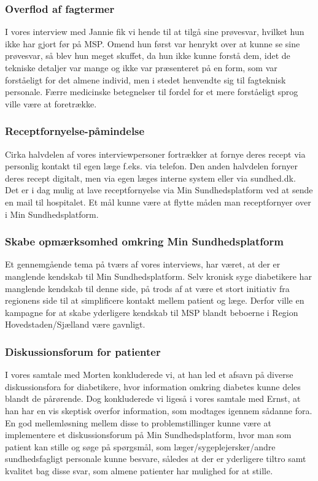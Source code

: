 \subsubsection{Overflod af fagtermer}
I vores interview med Jannie fik vi hende til at tilgå sine prøvesvar, hvilket hun ikke har gjort før på MSP. Omend hun først var henrykt over at kunne se sine prøvesvar, så blev hun meget skuffet, da hun ikke kunne forstå dem, idet de tekniske detaljer var mange og ikke var præsenteret på en form, som var forståeligt for det almene individ, men i stedet henvendte sig til fagteknisk personale. Færre medicinske betegnelser til fordel for et mere forståeligt sprog ville være at foretrække. 

\subsubsection{Receptfornyelse-påmindelse}
Cirka halvdelen af vores interviewpersoner fortrækker at fornye deres recept via personlig kontakt til egen læge f.eks. via telefon. Den anden halvdelen fornyer deres recept digitalt, men via egen læges interne system eller via sundhed.dk. \\
Det er i dag mulig at lave receptfornyelse via Min Sundhedsplatform ved at sende en mail til hospitalet. Et mål kunne være at flytte måden man receptfornyer over i Min Sundhedsplatform.

\subsubsection{Skabe opmærksomhed omkring Min Sundhedsplatform}
Et gennemgående tema på tværs af vores interviews, har været, at der er manglende kendskab til Min Sundhedsplatform. Selv kronisk syge diabetikere har manglende kendskab til denne side, på trods af at være et stort initiativ fra regionens side til at simplificere kontakt mellem patient og læge. Derfor ville en kampagne for at skabe yderligere kendskab til MSP blandt beboerne i Region Hovedstaden/Sjælland være gavnligt.

\subsubsection{Diskussionsforum for patienter}
I vores samtale med Morten konkluderede vi, at han led et afsavn på diverse diskussionsfora for diabetikere, hvor information omkring diabetes kunne deles blandt de pårørende.
Dog konkluderede vi ligeså i vores samtale med Ernst, at han har en vis skeptisk overfor information, som modtages igennem sådanne fora. En god mellemløsning mellem disse to problemstillinger kunne være at implementere et diskussionsforum på Min Sundhedsplatform, hvor man som patient kan stille og søge på spørgsmål, som læger/sygeplejersker/andre sundhedsfagligt personale kunne besvare, således at der er yderligere tiltro samt kvalitet bag disse svar, som almene patienter har mulighed for at stille. 

